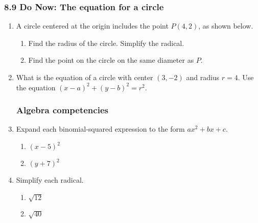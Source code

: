 \documentclass[12pt, twoside]{article}
\begin{document}
\subsubsection*{8.9 Do Now: The equation for a circle}
 \begin{enumerate}

  \item A circle centered at the origin includes the point $P(4,2)$, as shown below.
  \begin{multicols}{2}
    \raggedcolumns
    \begin{enumerate}
      \item Find the radius of the circle. Simplify the radical. \vspace{2.7cm}
      \item Find the point on the circle on the same diameter as $P$.
    \end{enumerate}
  \end{multicols}

  \item What is the equation of a circle with center $(3,-2)$ and radius $r=4$. Use the equation $(x-a)^2+(y-b)^2=r^2$. \vspace{1.5cm}
  
\subsubsection*{Algebra competencies}
\item Expand each binomial-squared expression to the form $ax^2+bx+c$.
  \begin{multicols}{2}
  \begin{enumerate}[itemsep=3cm]
    \item $(x-5)^2$ 
    \item $(y+7)^2$ 
  \end{enumerate}
  \end{multicols}\vspace{3cm}
  
  \item Simplify each radical.
  \begin{multicols}{2}
    \begin{enumerate}[itemsep=2cm]
      \item $\sqrt{12}$ 
      \item $\sqrt{40}$
    \end{enumerate}
    \end{multicols}\vspace{2cm}


\end{enumerate}
\end{document}
